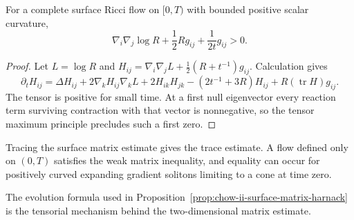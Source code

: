 \begin{proposition}
\label{prop:chow-ii-surface-matrix-harnack}

For a complete surface Ricci flow on \([0,T)\) with bounded positive scalar
curvature,
\[
\nabla_i\nabla_j\log R+\frac12Rg_{ij}+\frac1{2t}g_{ij}>0.
\]
\end{proposition}
\begin{proof}
\sketch Let \(L=\log R\) and
\(H_{ij}=\nabla_i\nabla_jL+\tfrac12(R+t^{-1})g_{ij}\).  Calculation gives
\[
\partial_tH_{ij}=\Delta H_{ij}+2\nabla_kH_{ij}\nabla_kL
+2H_{ik}H_{jk}-(2t^{-1}+3R)H_{ij}+R(\operatorname{tr}H)g_{ij}.
\]
The tensor is positive for small time.  At a first null eigenvector every
reaction term surviving contraction with that vector is nonnegative, so the
tensor maximum principle precludes such a first zero.
\end{proof}

\begin{remark}
\label{rem:chow-ii-surface-matrix-harnack-consequences}


Tracing the surface matrix estimate gives the trace estimate.  A flow defined
only on \((0,T)\) satisfies the weak matrix inequality, and equality can occur
for positively curved expanding gradient solitons limiting to a cone at time
zero.
\end{remark}

\begin{remark}
\label{rem:chow-ii-surface-matrix-evolution-reference}

The evolution formula used in Proposition~\ref{prop:chow-ii-surface-matrix-harnack}
is the tensorial mechanism behind the two-dimensional matrix estimate.
\end{remark}

